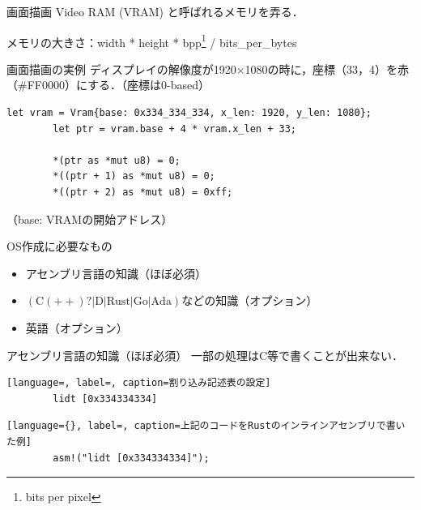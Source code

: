 \documentclass[titlepage,dvipdfmx,uplatex,a4j,12pt]{beamer}
\begin{document}
\begin{frame}{画面描画}
    Video RAM (VRAM) と呼ばれるメモリを弄る．

    メモリの大きさ：width * height * bpp\footnote{bits per pixel} / bits\_per\_bytes
\end{frame}

\begin{frame}[fragile]{画面描画の実例}
    ディスプレイの解像度が1920$\times$1080の時に，座標（33，4）を赤（\#FF0000）にする．（座標は0-based）

    \begin{lstlisting}[language={}, label=code:vram, caption=コード]
        let vram = Vram{base: 0x334_334_334, x_len: 1920, y_len: 1080};
        let ptr = vram.base + 4 * vram.x_len + 33;

        *(ptr as *mut u8) = 0;
        *((ptr + 1) as *mut u8) = 0;
        *((ptr + 2) as *mut u8) = 0xff;
    \end{lstlisting}
    （base: VRAMの開始アドレス）
\end{frame}

\begin{frame}{OS作成に必要なもの}
    \begin{itemize}
        \item アセンブリ言語の知識（ほぼ必須）
        \item $\mathrm{\left( C\left( ++ \right)?|D|Rust|Go|Ada \right)}$などの知識（オプション）
        \item 英語（オプション）
    \end{itemize}
\end{frame}

\begin{frame}[fragile]{アセンブリ言語の知識（ほぼ必須）}
    一部の処理はC等で書くことが出来ない．

    \begin{lstlisting}[language=, label=, caption=割り込み記述表の設定]
        lidt [0x334334334]
    \end{lstlisting}

    \begin{lstlisting}[language={}, label=, caption=上記のコードをRustのインラインアセンブリで書いた例]
        asm!("lidt [0x334334334]");
    \end{lstlisting}
\end{frame}
\end{document}
